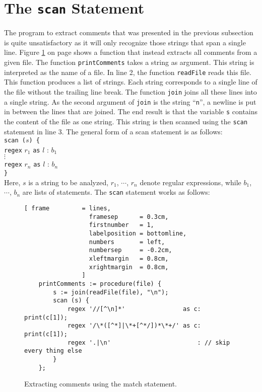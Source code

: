 \section{The \texttt{scan} Statement}
The program to extract comments that was presented in the previous subsection is quite
unsatisfactory as it will only recognize those strings that span a single line.
Figure \ref{fig:find-comments-scan.stlx} on page \pageref{fig:find-comments-scan.stlx} shows a
function that instead extracts all 
comments from a given file.  The function \texttt{printComments} takes a string as
argument.  This string is interpreted as the name of a file.  In line 2, the function 
\texttt{readFile} reads this file.  This function produces a list of strings.  Each string
corresponds to a single line of the file without the trailing line break.  The function
\texttt{join} joins all these lines into a single string.  As the second argument of
\texttt{join} is the string ``\texttt{n}'', a newline is put in between the
lines that are joined.  The end result is that the variable \texttt{s} contains the
content of the file as one string.  This string is then scanned using the \texttt{scan}
statement in line 3. The general form of a scan statement is as follows:
\\[0.2cm]
\hspace*{1.3cm} \texttt{scan ($s$) \{}  \\
\hspace*{1.8cm} \texttt{regex} $r_1$ \texttt{as} $l$ : $b_1$ \\
\hspace*{1.8cm} $\vdots$                                                  \\
\hspace*{1.8cm} \texttt{regex} $r_n$ \texttt{as} $l$ : $b_n$ \\
\hspace*{1.3cm} \texttt{\}}             
\\[0.2cm]
Here, $s$ is a string to be analyzed, $r_1$, $\cdots$, $r_n$ denote regular
expressions, while $b_1$, $\cdots$, $b_n$ are lists of statements.  The \texttt{scan}
statement works as follows:

\begin{figure}[t]
\centering
\begin{Verbatim}[ frame         = lines, 
                  framesep      = 0.3cm, 
                  firstnumber   = 1,
                  labelposition = bottomline,
                  numbers       = left,
                  numbersep     = -0.2cm,
                  xleftmargin   = 0.8cm,
                  xrightmargin  = 0.8cm,
                ]
    printComments := procedure(file) {
        s := join(readFile(file), "\n");
        scan (s) {
            regex '//[^\n]*'                as c: print(c[1]);
            regex '/\*([^*]|\*+[^*/])*\*+/' as c: print(c[1]);
            regex '.|\n'                        : // skip every thing else
        }
    };
\end{Verbatim}
\vspace*{-0.3cm}
\caption{Extracting comments using the match statement.}
\label{fig:find-comments-scan.stlx}
\end{figure}


